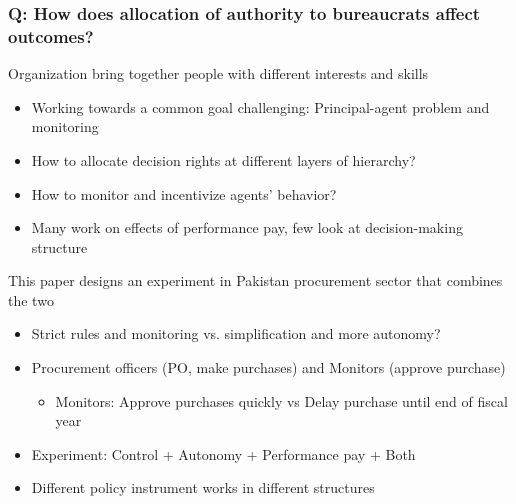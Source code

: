 \documentclass[aspectratio=169]{beamer}
\begin{document}
\begin{frame}
\frametitle{Q: How does allocation of authority to bureaucrats affect outcomes?} 
Organization bring together people with different interests and skills
\begin{itemize}\setlength\itemsep{3pt}
\item Working towards a common goal challenging: Principal-agent problem and monitoring
\item How to allocate decision rights at different layers of hierarchy?
\item How to monitor and incentivize agents' behavior?
\item Many work on effects of performance pay, few look at decision-making structure
\end{itemize}\medskip
This paper designs an experiment in Pakistan procurement sector that combines the two
\begin{itemize}\setlength\itemsep{3pt}
\item Strict rules and monitoring vs. simplification and more autonomy?
\item Procurement officers (PO, make purchases) and Monitors (approve purchase) 
\begin{itemize}\setlength\itemsep{3pt}
\item Monitors: Approve purchases quickly vs Delay purchase until end of fiscal year
\end{itemize}
\item Experiment: Control + Autonomy + Performance pay + Both 
\item Different policy instrument works in different structures
\end{itemize}
\end{frame}
\end{document}
